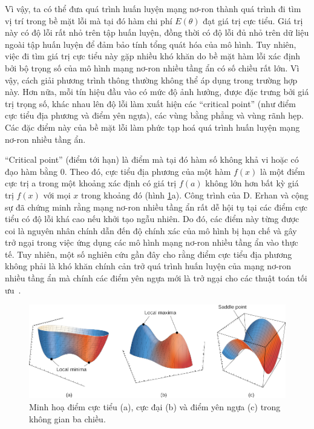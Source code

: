 Vì vậy, ta có thể đưa quá trình huấn luyện mạng nơ-ron thành quá trình đi tìm vị trí trong bề mặt lỗi mà tại đó hàm chi phí $E(\theta)$ đạt giá trị cực tiểu. Giá trị này có độ lỗi rất nhỏ trên tập huấn luyện, đồng thời có độ lỗi đủ nhỏ trên dữ liệu ngoài tập huấn luyện để đảm bảo tính tổng quát hóa của mô hình. Tuy nhiên, việc đi tìm giá trị cực tiểu này gặp nhiều khó khăn do bề mặt hàm lỗi xác định bởi bộ trọng số của mô hình mạng nơ-ron nhiều tầng ẩn có số chiều rất lớn. Vì vậy, cách giải phương trình thông thường không thể áp dụng trong trường hợp này. Hơn nữa, mỗi tín hiệu đầu vào có mức độ ảnh hưởng, được đặc trưng bởi giá trị trọng số, khác nhau lên độ lỗi làm xuất hiện các ``critical point'' (như điểm cực tiểu địa phương và điểm yên ngựa), các vùng bằng phẳng và vùng rãnh hẹp. Các đặc điểm này của bề mặt lỗi làm phức tạp hoá quá trình huấn luyện mạng nơ-ron nhiều tầng ẩn.

``Critical point'' (điểm tới hạn) là điểm mà tại đó hàm số không khả vi hoặc có đạo hàm bằng 0. Theo đó, cực tiểu địa phương của một hàm $f(x)$ là một điểm cực trị a trong một khoảng xác định có giá trị $f(a)$ không lớn hơn bất kỳ giá trị $f(x)$ với mọi $x$ trong khoảng đó (hình \ref{fig:minimas}a). Công trình của D. Erhan và cộng sự \cite{erhan2009thedifficulty} đã chứng minh rằng mạng nơ-ron nhiều tầng ẩn rất dễ hội tụ tại các điểm cực tiểu có độ lỗi khá cao nếu khởi tạo ngẫu nhiên. Do đó, các điểm này từng được coi là nguyên nhân chính dẫn đến độ chính xác của mô hình bị hạn chế \cite{bengio2007scaling} và gây trở ngại trong việc ứng dụng các mô hình mạng nơ-ron nhiều tầng ẩn vào thực tế. Tuy nhiên, một số nghiên cứu gần đây cho rằng điểm cực tiểu địa phương không phải là khó khăn chính cản trở quá trình huấn luyện của mạng nơ-ron nhiều tầng ẩn mà chính các điểm yên ngựa mới là trở ngại cho các thuật toán tối ưu~\cite{dauphin2014identifying}.

\begin{figure}[htp]
	\centering
	\includegraphics[width=140 mm]{images/minimas.png}
	\caption{Minh hoạ điểm cực tiểu (a), cực đại (b) và điểm yên ngựa (c) trong không gian ba chiều.}
	\label{fig:minimas}
\end{figure}

